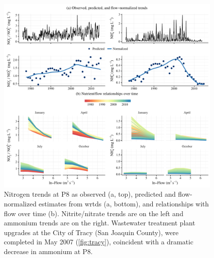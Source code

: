 \documentclass[letterpaper,12pt,oneside]{article}\usepackage[]{graphicx}\usepackage[]{color}
\begin{document}
\begin{figure}[!ht]

{\centering \includegraphics[width=\textwidth]{figs/p8trnds-1} 

}

\caption{Nitrogen trends at P8 as observed (a, top), predicted and flow-normalized estimates from \ac{wrtds} (a, bottom), and relationships with flow over time (b).  Nitrite/nitrate trends are on the left and ammonium trends are on the right.  Wastewater treatment plant upgrades at the City of Tracy (San Joaquin County), were completed in May 2007 (\cref{fig:tracy}), coincident with a dramatic decrease in ammonium at P8.}\label{fig:p8trnds}
\end{figure}
\end{document}
